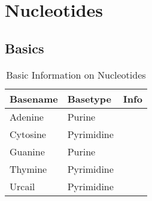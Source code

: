 \section{Nucleotides}
\subsection{Basics}
\begin{table}[h!]
	\centering
	\begin{tabular}{l l l}
		\toprule
		Basename		&	Basetype		& Info \\
		\midrule 
		Adenine		&	Purine		&	\\
		Cytosine		&	Pyrimidine	&	\\
		Guanine		&	Purine		&	\\
		Thymine		&	Pyrimidine	&	\\
		Urcail		&	Pyrimidine	&	\\
		\bottomrule
	\end{tabular}
	\caption{Basic Information on Nucleotides}
	\label{tab:nucleotides}
\end{table}
